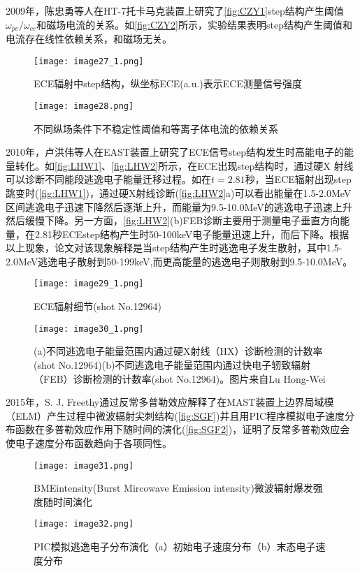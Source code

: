 2009年，陈忠勇等人在HT-7托卡马克装置上研究了\autoref{fig:CZY1}step结构产生阈值$ω_{pe}/ω_{ce} $和磁场电流的关系。如\autoref{fig:CZY2}所示，实验结果表明step结构产生阈值和电流存在线性依赖关系，和磁场无关\cite{RN1554}。
\begin{figure}[ht]
\centering
\texttt{[image: image27\_1.png]}
\caption{\label{fig:CZY1}ECE辐射中step结构\cite{RN1554}，纵坐标ECE(a.u.)表示ECE测量信号强度}
\end{figure}
\begin{figure}[ht]
\centering
\texttt{[image: image28.png]}
\caption{\label{fig:CZY2}不同纵场条件下不稳定性阈值和等离子体电流的依赖关系}
\end{figure}
\par 2010年，卢洪伟等人在EAST装置上研究了ECE信号step结构发生时高能电子的能量转化\cite{RN2102}。如\autoref{fig:LHW1}、\autoref{fig:LHW2}所示，在ECE出现step结构时，通过硬X 射线可以诊断不同能段逃逸电子能量迁移过程。如在$t=2.81$秒，当ECE辐射出现step跳变时(\autoref{fig:LHW1})，通过硬X射线诊断(\autoref{fig:LHW2}a)可以看出能量在1.5-2.0MeV区间逃逸电子迅速下降然后逐渐上升，而能量为9.5-10.0MeV的逃逸电子迅速上升然后缓慢下降。另一方面，\autoref{fig:LHW2}(b)FEB诊断主要用于测量电子垂直方向能量，在2.81秒ECEstep结构产生时50-100keV电子能量迅速上升，而后下降。根据以上现象，论文对该现象解释是当step结构产生时逃逸电子发生散射，其中1.5-2.0MeV逃逸电子散射到50-199keV,而更高能量的逃逸电子则散射到9.5-10.0MeV。
\begin{figure}[ht]
\centering
\texttt{[image: image29\_1.png]}
\caption{\label{fig:LHW1}ECE辐射细节(shot No.12964)\cite{RN2102}}
\end{figure}
\begin{figure}[ht]
\centering
\texttt{[image: image30\_1.png]}
\caption{\label{fig:LHW2}(a)不同逃逸电子能量范围内通过硬X射线（HX）诊断检测的计数率(shot No.12964)(b)不同逃逸电子能量范围内通过快电子轫致辐射（FEB）诊断检测的计数率(shot No.12964)。图片来自Lu Hong-Wei\cite{RN2102}}
\end{figure}
\par 2015年，S. J. Freethy通过反常多普勒效应解释了在MAST装置上边界局域模（ELM）产生过程中微波辐射尖刺结构\cite{RN1868}(\autoref{fig:SGF})并且用PIC程序模拟电子速度分布函数在多普勒效应作用下随时间的演化(\autoref{fig:SGF2})，证明了反常多普勒效应会使电子速度分布函数趋向于各项同性。
\begin{figure}[ht]
\centering
\texttt{[image: image31.png]}
\caption{\label{fig:SGF}BMEintensity(Burst Mircowave Emission intensity)微波辐射爆发强度随时间演化\cite{RN1868}}
\end{figure}
\begin{figure}[ht]
\centering
\texttt{[image: image32.png]}
\caption{\label{fig:SGF2}PIC模拟逃逸电子分布演化（a）初始电子速度分布（b）末态电子速度分布\cite{RN1868}}
\end{figure}

